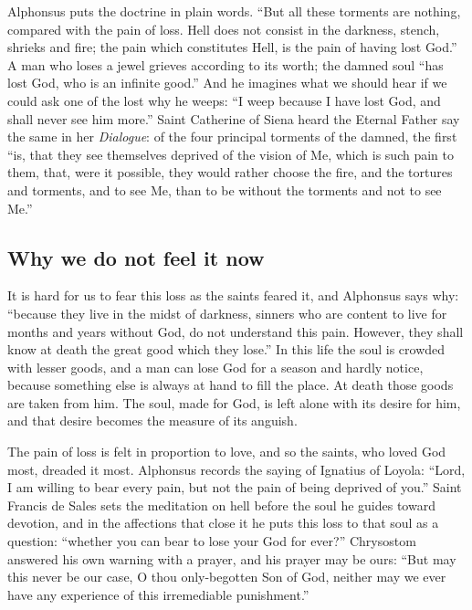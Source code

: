Alphonsus puts the doctrine in plain words. ``But all these torments are nothing, compared with the pain of loss. Hell does not consist in the darkness, stench, shrieks and fire; the pain which constitutes Hell, is the pain of having lost God.'' A man who loses a jewel grieves according to its worth; the damned soul ``has lost God, who is an infinite good.'' And he imagines what we should hear if we could ask one of the lost why he weeps: ``I weep because I have lost God, and shall never see him more.'' Saint Catherine of Siena heard the Eternal Father say the same in her \emph{Dialogue}: of the four principal torments of the damned, the first ``is, that they see themselves deprived of the vision of Me, which is such pain to them, that, were it possible, they would rather choose the fire, and the tortures and torments, and to see Me, than to be without the torments and not to see Me.''

\subsection{Why we do not feel it now}

It is hard for us to fear this loss as the saints feared it, and Alphonsus says why: ``because they live in the midst of darkness, sinners who are content to live for months and years without God, do not understand this pain. However, they shall know at death the great good which they lose.'' In this life the soul is crowded with lesser goods, and a man can lose God for a season and hardly notice, because something else is always at hand to fill the place. At death those goods are taken from him. The soul, made for God, is left alone with its desire for him, and that desire becomes the measure of its anguish.

The pain of loss is felt in proportion to love, and so the saints, who loved God most, dreaded it most. Alphonsus records the saying of Ignatius of Loyola: ``Lord, I am willing to bear every pain, but not the pain of being deprived of you.'' Saint Francis de Sales sets the meditation on hell before the soul he guides toward devotion, and in the affections that close it he puts this loss to that soul as a question: ``whether you can bear to lose your God for ever?'' Chrysostom answered his own warning with a prayer, and his prayer may be ours: ``But may this never be our case, O thou only-begotten Son of God, neither may we ever have any experience of this irremediable punishment.''

